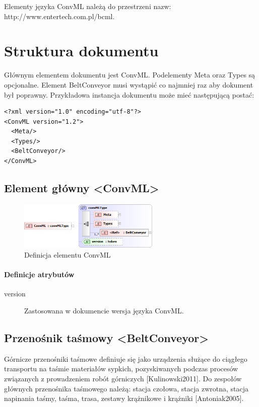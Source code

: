 \documentclass[12pt,a4paper]{article}
\begin{document}
Elementy języka ConvML należą do przestrzeni nazw:
http://www.entertech.com.pl/bcml.


\section{Struktura dokumentu}
Głównym elementem dokumentu jest ConvML.  Podelementy Meta oraz Types są
opcjonalne. Element BeltConveyor musi wystąpić co najmniej raz aby dokument był
poprawny.  Przykładowa instancja dokumentu może mieć następującą postać:

\begin{verbatim}
<?xml version="1.0" encoding="utf-8"?>
<ConvML version="1.2">
  <Meta/>
  <Types/>
  <BeltConveyor/>
</ConvML>
\end{verbatim}  


\subsection{Element główny <ConvML>}

\begin{figure}[h]
  \centering
  \includegraphics[width=0.6\textwidth]{png/convml_xsd2}
  \caption{Definicja elementu ConvML}
  \label{fig:convml-xsd}
\end{figure}

\paragraph{Definicje atrybutów}
\begin{description}
\item[version] Zastosowana w dokumencie wersja języka ConvML.
\end{description}


\subsection{Przenośnik taśmowy <BeltConveyor>}
Górnicze przenośniki taśmowe definiuje się jako urządzenia służące do ciągłego
transportu na taśmie materiałów sypkich, pozyskiwanych podczas procesów
związanych z prowadzeniem robót górniczych [Kulinowski2011].  Do zespołów
głównych przenośnika taśmowego należą: stacja czołowa, stacja zwrotna, stacja
napinania taśmy, taśma, trasa, zestawy krążnikowe i krążniki [Antoniak2005].
\end{document}
